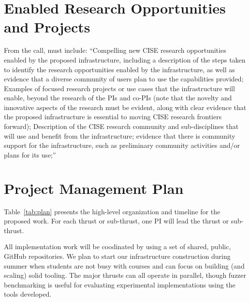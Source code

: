 \section{Enabled Research Opportunities and Projects}

From the call, must include: ``Compelling new CISE research opportunities enabled by the proposed infrastructure, including a description of the steps taken to identify the research opportunities enabled by the infrastructure, as well as evidence that a diverse community of users plan to use the capabilities provided;
Examples of focused research projects or use cases that the infrastructure will enable, beyond the research of the PIs and co-PIs (note that the novelty and innovative aspects of the research must be evident, along with clear evidence that the proposed infrastructure is essential to moving CISE research frontiers forward);
Description of the CISE research community and sub-disciplines that will use and benefit from the infrastructure; evidence that there is community support for the infrastructure, such as preliminary community activities and/or plans for its use;''

\section{Project Management Plan}

%
\label{sec:plan}

Table~\ref{tab:plan} presents the high-level organization and timeline for the 
proposed
work. For each thrust or sub-thrust, one PI will lead the thrust or sub-thrust.

All implementation work will be coodinated by using a set of shared, public, 
GitHub repositories.    We plan to start our
infrastructure construction during summer when students are
not busy with courses and can focus on
building (and scaling) solid tooling.  The major thrusts can all operate in 
parallel, though fuzzer benchmarking is useful for evaluating experimental 
implementations using the tools developed.


